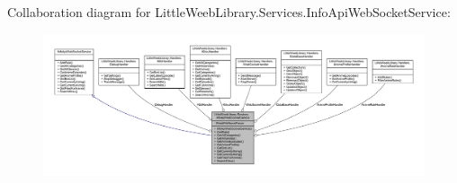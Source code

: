 Collaboration diagram for Little\+Weeb\+Library.\+Services.\+Info\+Api\+Web\+Socket\+Service\+:\nopagebreak
\begin{figure}[H]
\begin{center}
\leavevmode
\includegraphics[width=350pt]{class_little_weeb_library_1_1_services_1_1_info_api_web_socket_service__coll__graph}
\end{center}
\end{figure}

